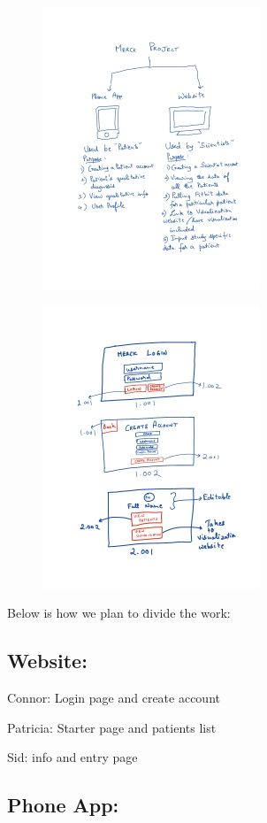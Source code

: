 \documentclass[]{book}
\begin{document}
\begin{figure}
\centering
\includegraphics{images/project_overview.png}
\caption{}
\end{figure}

\begin{figure}
\centering
\includegraphics{images/page1_001.jpg}
\caption{}
\end{figure}

Below is how we plan to divide the work:

\subsection{Website:}\label{website}

Connor: Login page and create account

Patricia: Starter page and patients list

Sid: info and entry page

\subsection{Phone App:}\label{phone-app}
\end{document}
